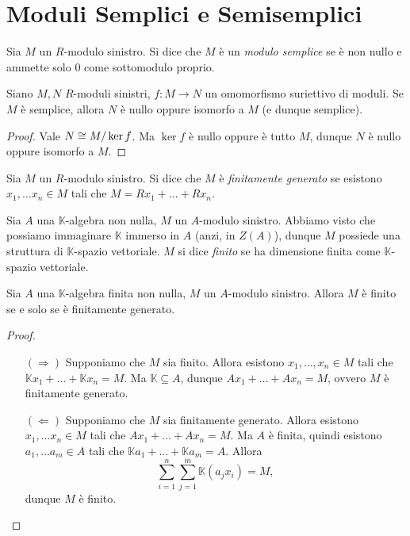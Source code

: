 \section{Moduli Semplici e Semisemplici}

\begin{definition}
Sia $M$ un $R$-modulo sinistro. Si dice che $M$ è un \emph{modulo semplice} se è non nullo e ammette solo $0$ come sottomodulo proprio.
\end{definition}

\begin{proposition}
Siano $M,N$ $R$-moduli sinistri, $f:M\to N$ un omomorfismo suriettivo di moduli. Se $M$ è semplice, allora $N$ è nullo oppure isomorfo a $M$ (e dunque semplice).
\end{proposition}
\begin{proof}
Vale $N\cong M/\ker f$. Ma $\ker f$ è nullo oppure è tutto $M$, dunque $N$ è nullo oppure isomorfo a $M$.
\end{proof}


\begin{definition}
Sia $M$ un $R$-modulo sinistro. Si dice che $M$ è \emph{finitamente generato} se esistono $x_1,\ldots x_n\in M$ tali che $M=Rx_1+\ldots+Rx_n$.
\end{definition}

\begin{definition}
Sia $A$ una $\mathbb{K}$-algebra non nulla, $M$ un $A$-modulo sinistro. Abbiamo visto che possiamo immaginare $\mathbb{K}$ immerso in $A$ (anzi, in $Z(A)$), dunque $M$ possiede una struttura di $\mathbb{K}$-spazio vettoriale. $M$ si dice \emph{finito} se ha dimensione finita come $\mathbb{K}$-spazio vettoriale.
\end{definition}

\begin{proposition}
Sia $A$ una $\mathbb{K}$-algebra finita non nulla, $M$ un $A$-modulo sinistro. Allora $M$ è finito se e solo se è finitamente generato.
\end{proposition}
\begin{proof}
\leavevmode
\begin{itemize}
\item[$(\Rightarrow)$] Supponiamo che $M$ sia finito. Allora esistono $x_1,\ldots, x_n\in M$ tali che $\mathbb{K}x_1+\ldots+\mathbb{K}x_n=M$. Ma $\mathbb{K}\subseteq A$, dunque $Ax_1+\ldots+Ax_n=M$, ovvero $M$ è finitamente generato.
\item[$(\Leftarrow)$] Supponiamo che $M$ sia finitamente generato. Allora esistono $x_1,\ldots x_n\in M$ tali che $Ax_1+\ldots+Ax_n=M$. Ma $A$ è finita, quindi esistono $a_1,\ldots a_m\in A$ tali che $\mathbb{K}a_1+\ldots+\mathbb{K}a_m=A$. Allora
$$
\sum_{i=1}^{n}\sum_{j=1}^{m}\mathbb{K}(a_jx_i)=M,
$$
dunque $M$ è finito.
\end{itemize}
\end{proof}



